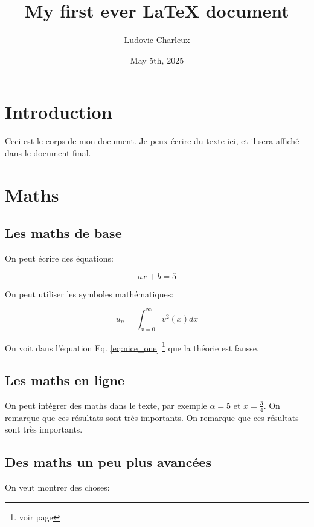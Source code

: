 \documentclass[10pt,a4paper,twoside]{article}
\author{Ludovic Charleux}
\title{My first ever LaTeX document}
\date{May 5th, 2025}
\begin{document}
\maketitle

\tableofcontents %

\section{Introduction}

Ceci est le corps de mon document.
Je peux écrire du texte ici, et il sera affiché dans le document final.

\blindtext[1]



\section{Maths}

\subsection{Les maths de base}

On peut écrire des équations:
\blindtext

$$
    a x + b = 5
$$

\noindent On peut utiliser les symboles mathématiques:

\begin{equation}
    u_n = \int_{x=0}^\infty v^2(x) dx
    \label{eq:nice_one}
\end{equation}

On voit dans l'équation Eq. \ref{eq:nice_one} \footnote{voir page \pageref{eq:nice_one}} que la théorie est fausse.

\subsection{Les maths en ligne}

On peut intégrer des maths dans le texte, par exemple $\alpha = 5$ et $x = \frac{3}{4}$.
On remarque que ces résultats sont très importants.
On remarque que ces résultats sont très importants.

\subsection{Des maths un peu plus avancées}

On veut montrer des choses:
\end{document}
